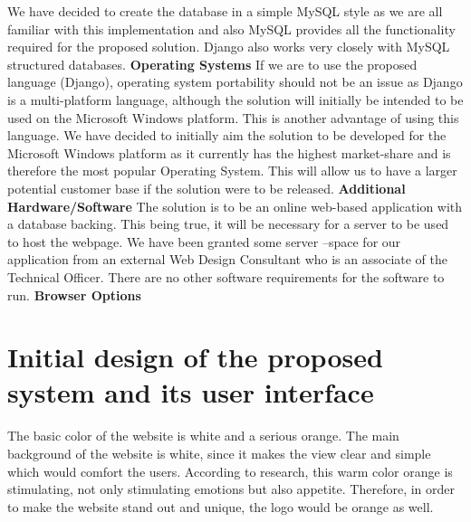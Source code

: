 \documentclass[12pt]{article}
\begin{document}
We have decided to create the database in a simple MySQL style as we are all familiar with this implementation and also MySQL provides all the functionality required for the proposed solution. Django also works very closely with MySQL structured databases.
\newline
\newline
\textbf{Operating Systems}
\newline
\newline
If we are to use the proposed language (Django), operating system portability should not be an issue as Django is a multi-platform language, although the solution will initially be intended to be used on the Microsoft Windows platform. This is another advantage of using this language.
We have decided to initially aim the solution to be developed for the Microsoft Windows platform as it currently has the highest market-share and is therefore the most popular Operating System. This will allow us to have a larger potential customer base if the solution were to be released. 
\newline
\newline
\textbf{Additional Hardware/Software}
\newline
\newline
The solution is to be an online web-based application with a database backing. This being true, it will be necessary for a server to be used to host the webpage. We have been granted some server –space for our application from an external Web Design Consultant who is an associate of the Technical Officer.
There are no other software requirements for the software to run.
\newline
\newline
\textbf{Browser Options}
\newline
\newline
\newpage

\section{Initial design of the proposed system and its user interface}
\vspace{5 mm}
The basic color of the website is white and a serious orange. The main background of the website is white, since it makes the view clear and simple which would comfort the users. According to research, this warm color orange is stimulating, not only stimulating emotions but also appetite. Therefore, in order to make the website stand out and unique, the logo would be orange as well.
\end{document}

